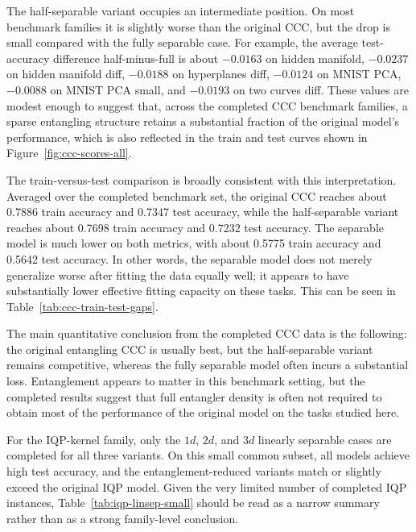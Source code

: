 \documentclass[12pt,a4paper,openany]{report}
\begin{document}
The half-separable variant occupies an intermediate position. On most benchmark families it is slightly worse than the original CCC, but the drop is small compared with the fully separable case. For example, the average test-accuracy difference half-minus-full is about \(-0.0163\) on hidden manifold, \(-0.0237\) on hidden manifold diff, \(-0.0188\) on hyperplanes diff, \(-0.0124\) on MNIST PCA, \(-0.0088\) on MNIST PCA small, and \(-0.0193\) on two curves diff. These values are modest enough to suggest that, across the completed CCC benchmark families, a sparse entangling structure retains a substantial fraction of the original model's performance, which is also reflected in the train and test curves shown in Figure~\ref{fig:ccc-scores-all}.

The train-versus-test comparison is broadly consistent with this interpretation. Averaged over the completed benchmark set, the original CCC reaches about 0.7886 train accuracy and 0.7347 test accuracy, while the half-separable variant reaches about 0.7698 train accuracy and 0.7232 test accuracy. The separable model is much lower on both metrics, with about 0.5775 train accuracy and 0.5642 test accuracy. In other words, the separable model does not merely generalize worse after fitting the data equally well; it appears to have substantially lower effective fitting capacity on these tasks. This can be seen in Table~\ref{tab:ccc-train-test-gaps}.



The main quantitative conclusion from the completed CCC data is the following: the original entangling CCC is usually best, but the half-separable variant remains competitive, whereas the fully separable model often incurs a substantial loss. Entanglement appears to matter in this benchmark setting, but the completed results suggest that full entangler density is often not required to obtain most of the performance of the original model on the tasks studied here.

For the IQP-kernel family, only the \(1d\), \(2d\), and \(3d\) linearly separable cases are completed for all three variants. On this small common subset, all models achieve high test accuracy, and the entanglement-reduced variants match or slightly exceed the original IQP model. Given the very limited number of completed IQP instances, Table~\ref{tab:iqp-linsep-small} should be read as a narrow summary rather than as a strong family-level conclusion.
\end{document}
